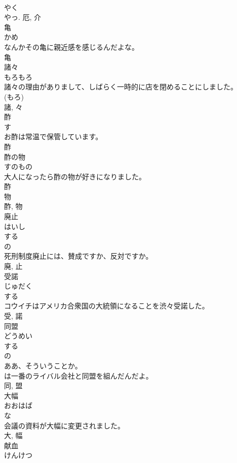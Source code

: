 \documentclass[8pt]{extreport}
\begin{document}
\begin{CJK}{UTF8}{min}
\\	やく 
\\	やっ.	厄, 介	
\\	亀	
\\	かめ	
\\	なんかその亀に親近感を感じるんだよな。	
\\	亀	
\\	諸々	
\\	もろもろ	
\\	諸々の理由がありまして、しばらく一時的に店を閉めることにしました。	
\\	(もろ) 
\\	諸, 々	
\\	酢	
\\	す	
\\	お酢は常温で保管しています。	
\\	酢	
\\	酢の物	
\\	すのもの	
\\	大人になったら酢の物が好きになりました。	
\\	酢 
\\	物 
\\	酢, 物	
\\	廃止	
\\	はいし	
\\	する 
\\	の 
\\	死刑制度廃止には、賛成ですか、反対ですか。	
\\	廃, 止	
\\	受諾	
\\	じゅだく	
\\	する 
\\	コウイチはアメリカ合衆国の大統領になることを渋々受諾した。	
\\	受, 諾	
\\	同盟	
\\	どうめい	
\\	する 
\\	の 
\\	ああ、そういうことか。
\\	は一番のライバル会社と同盟を組んだんだよ。	
\\	同, 盟	
\\	大幅	
\\	おおはば	
\\	な 
\\	会議の資料が大幅に変更されました。	
\\	大, 幅	
\\	献血	
\\	けんけつ	

\end{CJK}
\end{document}
